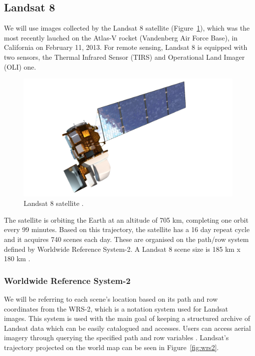 \documentclass[12pt, a4paper]{report}
\begin{document}
	\subsection{Landsat 8}
	\label{seq:landsat8_section}

	\par We will use images collected by the Landsat 8 satellite (Figure~\ref{fig:landsat_satellite}), which was the most recently lauched on the Atlas-V rocket (Vandenberg Air Force Base), in California on February 11, 2013. For remote sensing, Landsat 8 is equipped with two sensors, the Thermal Infrared Sensor (TIRS)  and Operational Land Imager (OLI) one.
	\begin{figure}[h!]
		\centering
		\includegraphics[scale=0.25]{../images/LandsatSatellite.png}
		\caption{Landsat 8 satellite \cite{lgng}.}
		\label{fig:landsat_satellite}
	\end{figure}

	\par The satellite is orbiting the Earth at an altitude of 705 km, completing one orbit every 99 minutes. Based on this trajectory, the satellite has a 16 day repeat cycle and it acquires 740 scenes each day. These are organised on the path/row system defined by Worldwide Reference System-2. A Landsat 8 scene size is 185 km x 180 km \cite{LANDSAT}. 
	
	\subsubsection{Worldwide Reference System-2}
	\label{par:wrs2}
	\par We will be referring to each scene's location based on its path and row coordinates from the WRS-2, which is a notation system used for Landsat images. This system is used with the main goal of keeping a structured archive of Landsat data which can be easily catalogued and accesses. Users can access aerial imagery through querying the specified path and row variables \cite{wrs}. Landsat's trajectory projected on the world map can be seen in Figure~\ref{fig:wrs2}.
\end{document}
